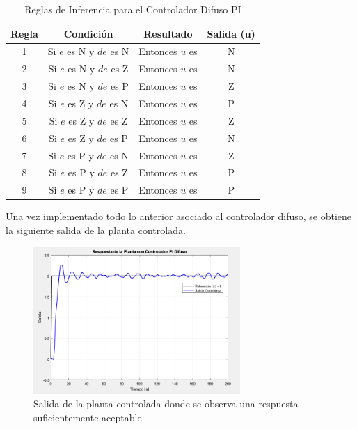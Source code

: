 \begin{enumerate}
    \begin{table}[h]
        \centering
        \caption{Reglas de Inferencia para el Controlador Difuso PI}
        \begin{tabular}{|c|c|c|c|}
        \hline
        \textbf{Regla} & \textbf{Condición} & \textbf{Resultado} & \textbf{Salida (u)} \\ \hline
        1 & Si \(e\) es N y \(de\) es N & Entonces \(u\) es & N \\ \hline
        2 & Si \(e\) es N y \(de\) es Z & Entonces \(u\) es & N \\ \hline
        3 & Si \(e\) es N y \(de\) es P & Entonces \(u\) es & Z \\ \hline
        4 & Si \(e\) es Z y \(de\) es N & Entonces \(u\) es & P \\ \hline
        5 & Si \(e\) es Z y \(de\) es Z & Entonces \(u\) es & Z \\ \hline
        6 & Si \(e\) es Z y \(de\) es P & Entonces \(u\) es & N \\ \hline
        7 & Si \(e\) es P y \(de\) es N & Entonces \(u\) es & Z \\ \hline
        8 & Si \(e\) es P y \(de\) es Z & Entonces \(u\) es & P \\ \hline
        9 & Si \(e\) es P y \(de\) es P & Entonces \(u\) es & P \\ \hline
        \end{tabular}
    \end{table}
    
    Una vez implementado todo lo anterior asociado al controlador difuso, se obtiene la siguiente salida de la planta controlada.
    
    \begin{figure}
        \centering
        \includegraphics[width=0.7\textwidth]{img/Figure_8}
        \caption{Salida de la planta controlada donde se observa una respuesta suficientemente aceptable.}
        \label{fig:8}
    \end{figure}
    

\end{enumerate}
